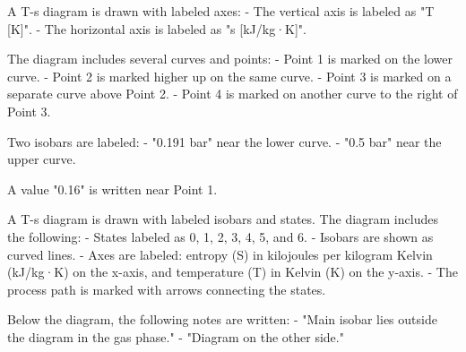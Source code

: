 A T-s diagram is drawn with labeled axes:  
- The vertical axis is labeled as "T [K]".  
- The horizontal axis is labeled as "s [kJ/kg·K]".  

The diagram includes several curves and points:  
- Point 1 is marked on the lower curve.  
- Point 2 is marked higher up on the same curve.  
- Point 3 is marked on a separate curve above Point 2.  
- Point 4 is marked on another curve to the right of Point 3.  

Two isobars are labeled:  
- "0.191 bar" near the lower curve.  
- "0.5 bar" near the upper curve.  

A value "0.16" is written near Point 1.

A T-s diagram is drawn with labeled isobars and states. The diagram includes the following:  
- States labeled as 0, 1, 2, 3, 4, 5, and 6.  
- Isobars are shown as curved lines.  
- Axes are labeled: entropy (S) in kilojoules per kilogram Kelvin (kJ/kg·K) on the x-axis, and temperature (T) in Kelvin (K) on the y-axis.  
- The process path is marked with arrows connecting the states.  

Below the diagram, the following notes are written:  
- "Main isobar lies outside the diagram in the gas phase."  
- "Diagram on the other side."